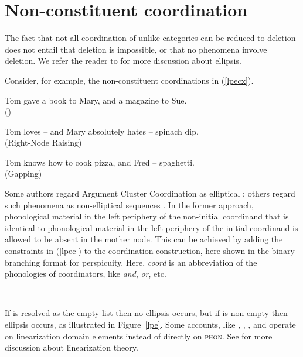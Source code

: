 \section{Non-constituent coordination}
\label{sec-non-constituent-coordination}

The fact that not all coordination of unlike categories can be reduced to deletion  does not entail that
deletion is impossible, or that no phenomena involve deletion.
We refer the reader to  for more discussion about ellipsis.

Consider, for example, the non-constituent coordinations in (\ref{lpecx}). 

\eal
\label{lpecx}
\ex 
\label{ex-tom-gave-a-book-to-mary-and-a-magazine-to-sue}
Tom gave a book to Mary, and a magazine to Sue.\\
()

\ex Tom loves -- and Mary absolutely hates -- spinach dip.\\
(Right-Node Raising)

\ex Tom knows how to cook pizza, and Fred -- spaghetti.\\
(Gapping)

\zl

Some authors regard Argument Cluster Coordination as elliptical \citep{yatabe01,Crysmann:04,Beavers}; others
regard such phenomena as non-elliptical sequences \citep{Mouret:06}.
In the former approach,  phonological material in the left periphery of the non-initial coordinand that is identical to
phonological material in the left periphery of the initial coordinand is allowed to be absent in the mother node.
This can be achieved by adding the constraints in (\ref{lpec}) to the coordination construction, here shown in the binary-branching format for perspicuity.
Here, {\it coord} is an abbreviation of the phonologies of coordinators, like
{\it and}, {\it or}, etc.

\ea
\label{lpec}
 \impl\\
\z

\noindent
If  is resolved as the empty list then no ellipsis occurs, but if  is non-empty then ellipsis occurs, as illustrated in Figure~\ref{lpe}. 
Some accounts, like  \citet{yatabe01}, \citet{Crysmann:04}, \citet{Beavers}, and \citet{chaveslp} operate on
linearization domain\label{page-linearization-domains-in-coordination-two} elements instead of directly on \textsc{phon}.  
See  for more discussion about linearization theory.


